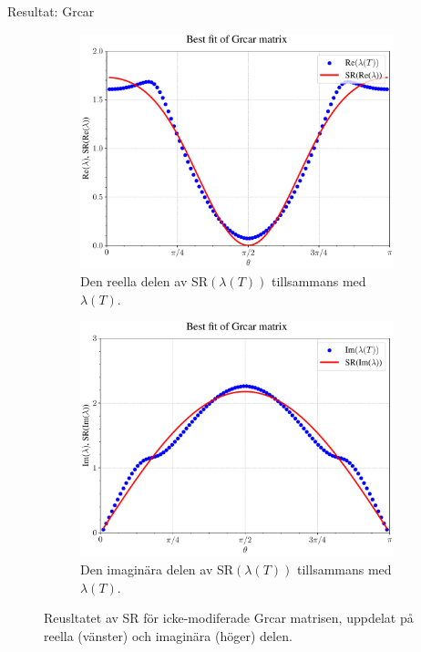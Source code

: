 \documentclass{beamer}
\begin{document}
\begin{frame}{Resultat: Grcar}
    \begin{figure}
    \centering
    \begin{subfigure}{0.49\textwidth}
        \includegraphics[width=\textwidth]{images/Ares1_re.pdf}
        \caption{Den reella delen av SR$(\lambda(T))$ tillsammans med $\lambda(T)$.}
        \label{fig:Ares1_re}
    \end{subfigure}
    \hfill
    \begin{subfigure}{0.49\textwidth}
        \includegraphics[width=\textwidth]{images/Ares1_im.pdf}
        \caption{Den imaginära delen av SR$(\lambda(T))$ tillsammans med $\lambda(T)$.}
        \label{fig:Ares1_im}
    \end{subfigure}
    \label{fig:Ares1}
    \caption{Reusltatet av SR för icke-modiferade Grcar matrisen, uppdelat på reella (vänster) och imaginära (höger) delen.}
    \end{figure}
\end{frame} 
\end{document}

